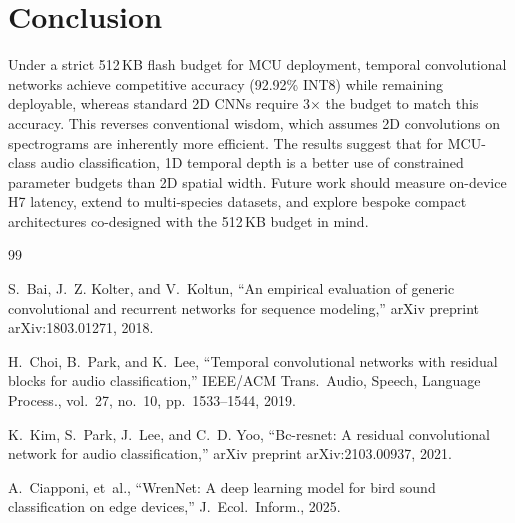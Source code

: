 \documentclass[conference]{IEEEtran}
\begin{document}
\section{Conclusion}

Under a strict 512\,KB flash budget for MCU deployment, temporal convolutional networks achieve competitive accuracy (92.92\% INT8) while remaining deployable, whereas standard 2D CNNs require 3$\times$ the budget to match this accuracy. This reverses conventional wisdom, which assumes 2D convolutions on spectrograms are inherently more efficient. The results suggest that for MCU-class audio classification, 1D temporal depth is a better use of constrained parameter budgets than 2D spatial width. Future work should measure on-device H7 latency, extend to multi-species datasets, and explore bespoke compact architectures co-designed with the 512\,KB budget in mind.


\begin{thebibliography}{99}

 S.~Bai, J.~Z. Kolter, and V.~Koltun, ``An empirical evaluation of generic convolutional and recurrent networks for sequence modeling,'' arXiv preprint arXiv:1803.01271, 2018.

 H.~Choi, B.~Park, and K.~Lee, ``Temporal convolutional networks with residual blocks for audio classification,'' IEEE/ACM Trans.~Audio, Speech, Language Process., vol.~27, no.~10, pp.~1533--1544, 2019.

 K.~Kim, S.~Park, J.~Lee, and C.~D. Yoo, ``Bc-resnet: A residual convolutional network for audio classification,'' arXiv preprint arXiv:2103.00937, 2021.

 A.~Ciapponi, et~al., ``WrenNet: A deep learning model for bird sound classification on edge devices,'' J.~Ecol.~Inform., 2025.

\end{thebibliography}
\end{document}
